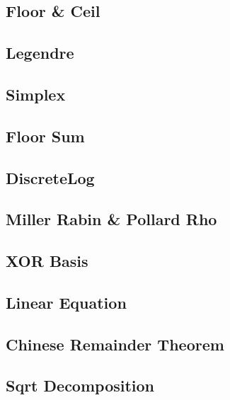 \documentclass{article}
\begin{document}
\subsection{Floor \& Ceil}


\subsection{Legendre}


\subsection{Simplex}


\subsection{Floor Sum}


\subsection{DiscreteLog}


\subsection{Miller Rabin \& Pollard Rho}


\subsection{XOR Basis}


\subsection{Linear Equation}


\subsection{Chinese Remainder Theorem}


\subsection{Sqrt Decomposition}

\end{document}
